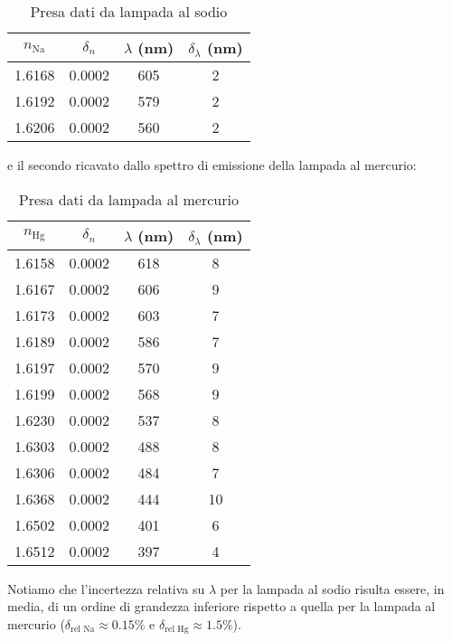 \documentclass[9pt,a4paper,twocolumn,twoside]{tau-class/tau}
\begin{document}
\begin{table}[H]
            \centering
            \begin{tabular}{cccc}
                \toprule
                \(n_\text{Na}\) & \(\delta_n\) & \(\lambda\) (nm) & \(\delta_\lambda\) (nm) \\
                \midrule
                1.6168 & 0.0002	& 605	& 2 \\
                1.6192 & 0.0002	& 579	& 2 \\
                1.6206 & 0.0002	& 560	& 2 \\
                \bottomrule   
            \end{tabular}
		\caption{Presa dati da lampada al sodio}
\end{table}
e il secondo ricavato dallo spettro di emissione della lampada al mercurio:
\begin{table}[H]
            \centering
            \begin{tabular}{cccc}
                \toprule
                \(n_\text{Hg}\) & \(\delta_n\) & \(\lambda\) (nm) & \(\delta_\lambda\) (nm) \\
                \midrule
                1.6158 &	0.0002	&618	&8 \\
                1.6167 &	0.0002	&606	&9 \\
                1.6173 &	0.0002	&603	&7 \\
                1.6189 &	0.0002	&586	&7 \\
                1.6197 &	0.0002	&570	&9 \\
                1.6199 &	0.0002	&568	&9 \\
                1.6230 &	0.0002	&537	&8 \\
                1.6303 &	0.0002	&488&	8 \\
                1.6306 &	0.0002	&484&	7 \\
                1.6368 &	0.0002	&444&	10 \\
                1.6502 &	0.0002	&401&	6 \\
                1.6512 &	0.0002	&397&	4 \\
                \bottomrule  
            \end{tabular}
            \caption{Presa dati da lampada al mercurio}
\end{table}
Notiamo che l'incertezza relativa su \(\lambda\) per la lampada al sodio risulta essere, in media, di un ordine di grandezza inferiore rispetto a quella per la lampada al mercurio (\(\delta_{\text{rel Na}} \approx 0.15\%\) e \(\delta_{\text{rel Hg}} \approx 1.5\%\)).
\end{document}
